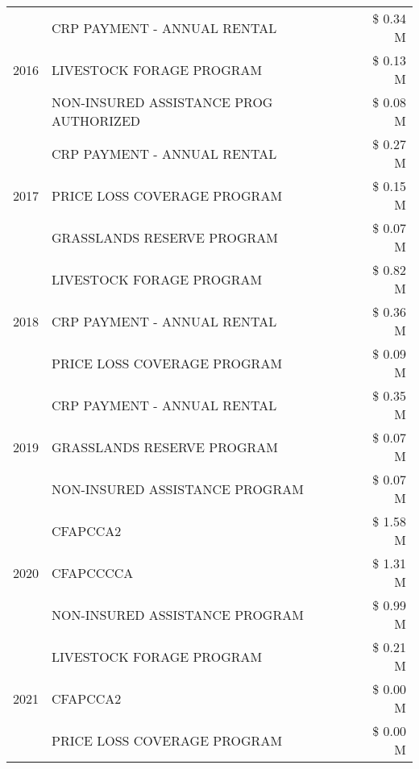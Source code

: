 \begin{tabular}{llr}
\cline{1-3}
\multirow[t]{3}{*}{2016} & CRP PAYMENT - ANNUAL RENTAL & \$ 0.34 M \\
 & LIVESTOCK FORAGE PROGRAM & \$ 0.13 M \\
 & NON-INSURED ASSISTANCE PROG AUTHORIZED & \$ 0.08 M \\
\cline{1-3}
\multirow[t]{3}{*}{2017} & CRP PAYMENT - ANNUAL RENTAL & \$ 0.27 M \\
 & PRICE LOSS COVERAGE PROGRAM & \$ 0.15 M \\
 & GRASSLANDS RESERVE PROGRAM & \$ 0.07 M \\
\cline{1-3}
\multirow[t]{3}{*}{2018} & LIVESTOCK FORAGE PROGRAM & \$ 0.82 M \\
 & CRP PAYMENT - ANNUAL RENTAL & \$ 0.36 M \\
 & PRICE LOSS COVERAGE PROGRAM & \$ 0.09 M \\
\cline{1-3}
\multirow[t]{3}{*}{2019} & CRP PAYMENT - ANNUAL RENTAL & \$ 0.35 M \\
 & GRASSLANDS RESERVE PROGRAM & \$ 0.07 M \\
 & NON-INSURED ASSISTANCE PROGRAM & \$ 0.07 M \\
\cline{1-3}
\multirow[t]{3}{*}{2020} & CFAPCCA2 & \$ 1.58 M \\
 & CFAPCCCCA & \$ 1.31 M \\
 & NON-INSURED ASSISTANCE PROGRAM & \$ 0.99 M \\
\cline{1-3}
\multirow[t]{3}{*}{2021} & LIVESTOCK FORAGE PROGRAM & \$ 0.21 M \\
 & CFAPCCA2 & \$ 0.00 M \\
 & PRICE LOSS COVERAGE PROGRAM & \$ 0.00 M \\
\cline{1-3}
\bottomrule
\end{tabular}
